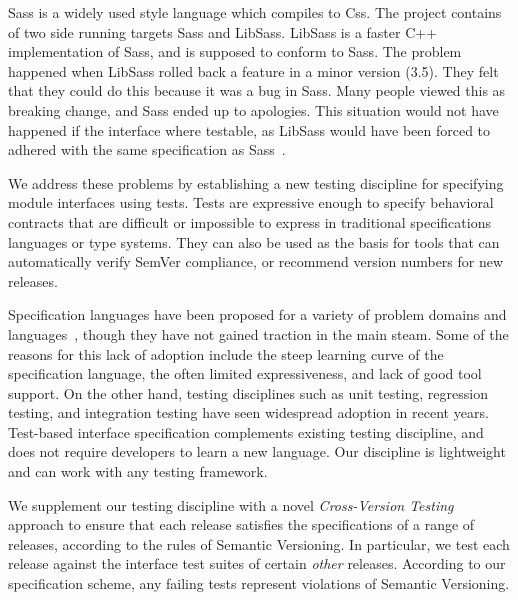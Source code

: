 Sass is a widely used style language which compiles to Css. The project
contains of two side running targets Sass and LibSass. LibSass is a 
faster C++ implementation of Sass, and is supposed to conform to Sass. The
problem happened when LibSass rolled back a feature in a minor version (3.5). 
They felt that they could do this because it was a bug in Sass. Many people 
viewed this as breaking change, and Sass ended up to apologies. This situation
would not have happened if the interface where testable, as LibSass would have
been forced to adhered with the same specification as Sass~\cite{libsass}. 
%



We address these problems by establishing a new testing discipline for
specifying module interfaces using tests. Tests are expressive enough
to specify behavioral contracts that are difficult or impossible to
express in traditional specifications languages or type systems. They
can also be used as the basis for tools that can automatically verify
SemVer compliance, or recommend version numbers for new releases.

Specification languages have been proposed for a variety of problem
domains and languages~\cite{uml},
though they have not gained traction in the main steam. 
%
Some of the reasons for this lack of adoption include the steep
learning curve of the specification language, the often limited
expressiveness, and lack of good tool support.
%
On the other hand, testing disciplines such as unit testing,
regression testing, and integration testing have seen widespread
adoption in recent years.
%
Test-based interface specification complements existing testing
discipline, and does not require developers to learn a new
language. Our discipline is lightweight and can work with any testing
framework.

We supplement our testing discipline with a novel \emph{Cross-Version
  Testing} approach to ensure that each release satisfies the
specifications of a range of releases, according to the rules of
Semantic Versioning. In particular, we test each release against the
interface test suites of certain {\em other} releases. According to
our specification scheme, any failing tests represent violations of
Semantic Versioning.

